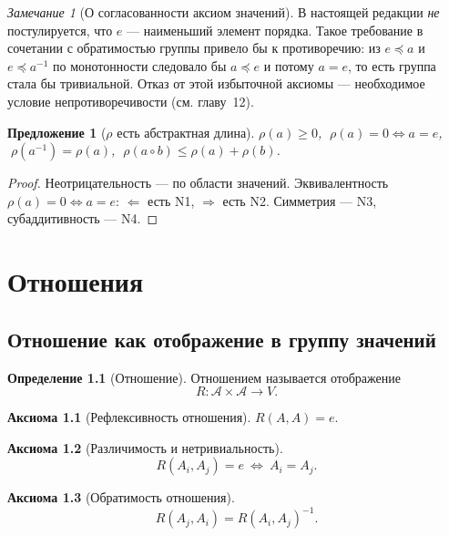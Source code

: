 \documentclass[12pt,a4paper,oneside]{book}
\theoremstyle{definition}
\newtheorem{axiom}{Аксиома}[chapter]
\newtheorem{definition}{Определение}[chapter]
\theoremstyle{plain}
\newtheorem{proposition}{Предложение}[chapter]
\theoremstyle{remark}
\newtheorem{remark}{Замечание}[chapter]
\newcommand{\Parts}{\mathcal A}
\newcommand{\Rel}{R}
\newcommand{\Values}{V}
\newcommand{\comp}{\circ}
\newcommand{\Vord}{\preceq}
\newcommand{\norm}{\rho}
\newcommand{\ide}{e}
\begin{document}
\begin{remark}[О согласованности аксиом значений]
В настоящей редакции \emph{не} постулируется, что $\ide$ --- наименьший элемент
порядка. Такое требование в сочетании с обратимостью группы привело бы к
противоречию: из $\ide\Vord a$ и $\ide\Vord a^{-1}$ по монотонности следовало бы
$a\Vord\ide$ и потому $a=\ide$, то есть группа стала бы тривиальной. Отказ от этой
избыточной аксиомы --- необходимое условие непротиворечивости (см. главу~12).
\end{remark}

\begin{proposition}[$\norm$ есть абстрактная длина]
$\norm(a)\ge0$, $\;\norm(a)=0\iff a=\ide$, $\;\norm(a^{-1})=\norm(a)$,
$\;\norm(a\comp b)\le\norm(a)+\norm(b)$.
\end{proposition}

\begin{proof}
Неотрицательность --- по области значений. Эквивалентность $\norm(a)=0\iff a=\ide$:
$\Leftarrow$ есть N1, $\Rightarrow$ есть N2. Симметрия --- N3, субаддитивность --- N4.
\end{proof}

\chapter{Отношения}

\section{Отношение как отображение в группу значений}

\begin{definition}[Отношение]
Отношением называется отображение
\[
\Rel:\Parts\times\Parts\to\Values.
\]
\end{definition}

\begin{axiom}[Рефлексивность отношения]
$\Rel(A,A)=\ide$.
\end{axiom}

\begin{axiom}[Различимость и нетривиальность]\label{ax:nontrivial}
\[
\Rel(A_i,A_j)=\ide\ \Longleftrightarrow\ A_i=A_j.
\]
\end{axiom}

\begin{axiom}[Обратимость отношения]\label{ax:invol}
\[
\Rel(A_j,A_i)=\Rel(A_i,A_j)^{-1}.
\]
\end{axiom}
\end{document}

